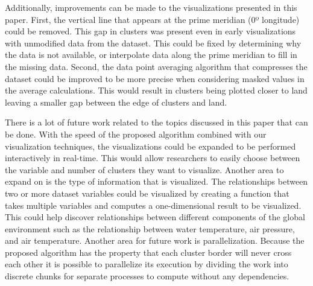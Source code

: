\documentclass[conference,compsoc]{IEEEtran}
\begin{document}
Additionally, improvements can be made to the visualizations presented in this paper. First, the vertical line that appears at the prime meridian (0º longitude) could be removed. This gap in clusters was present even in early visualizations with unmodified data from the dataset. This could be fixed by determining why the data is not available, or interpolate data along the prime meridian to fill in the missing data. Second, the data point averaging algorithm that compresses the dataset could be improved to be more precise when considering masked values in the average calculations. This would result in clusters being plotted closer to land leaving a smaller gap between the edge of clusters and land.

There is a lot of future work related to the topics discussed in this paper that can be done. With the speed of the proposed algorithm combined with our visualization techniques, the visualizations could be expanded to be performed interactively in real-time. This would allow researchers to easily choose between the variable and number of clusters they want to visualize. Another area to expand on is the type of information that is visualized. The relationships between two or more dataset variables could be visualized by creating a function that takes multiple variables and computes a one-dimensional result to be visualized. This could help discover relationships between different components of the global environment such as the relationship between water temperature, air pressure, and air temperature. Another area for future work is parallelization. Because the proposed algorithm has the property that each cluster border will never cross each other it is possible to parallelize its execution by dividing the work into discrete chunks for separate processes to compute without any dependencies.
\end{document}
